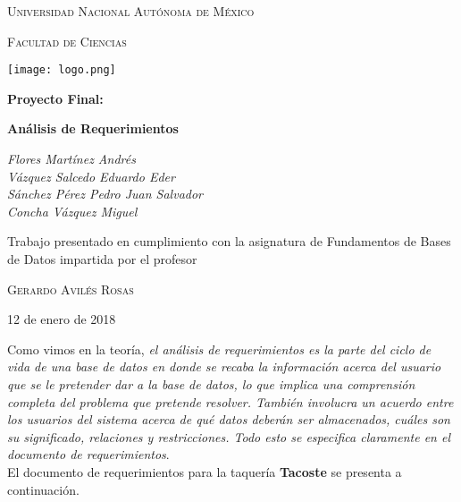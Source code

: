 \documentclass[11pt,letterpaper]{article}
\begin{document}
\begin{titlepage}
	\centering
	{\scshape\LARGE Universidad Nacional Autónoma de México \par}
	\vspace{1cm}
	{\scshape\Large Facultad de Ciencias\par}
	\vspace{1.5cm}
\begin{center}
		\texttt{[image: logo.png]}
	\end{center}
		\vspace{.8 cm}

	{\huge\bfseries Proyecto Final: \par}
	{\huge\bfseries Análisis de Requerimientos \par}
		\vspace{0.5cm}

	{\Large\itshape Flores Martínez Andrés\\
	Vázquez Salcedo Eduardo Eder\\
	Sánchez Pérez Pedro Juan Salvador\\
	Concha Vázquez Miguel\par}
	\vfill
			\vspace{0.5cm}

	Trabajo presentado en cumplimiento con la asignatura de Fundamentos de Bases de Datos impartida por el profesor	\par
	 \textsc{Gerardo Avilés Rosas}\\
	\vspace{0.1cm}
	{\large 12 de enero de 2018\par}
\end{titlepage}

\begin{center}
\tableofcontents
\end{center}

\newpage


Como vimos en la teoría, \textit{el análisis de requerimientos es la parte del
ciclo de vida de una base de datos en donde se recaba la información acerca
del usuario que se le pretender dar a la base de datos, lo que implica una
comprensión completa del problema que pretende resolver. También involucra un acuerdo entre los usuarios del sistema acerca de qué datos deberán ser
almacenados, cuáles son su significado, relaciones y restricciones. Todo esto
se especifica claramente en el documento de requerimientos}.\\

 El documento
de requerimientos para la taquería \textbf{Tacoste} se presenta a continuación.
\end{document}
